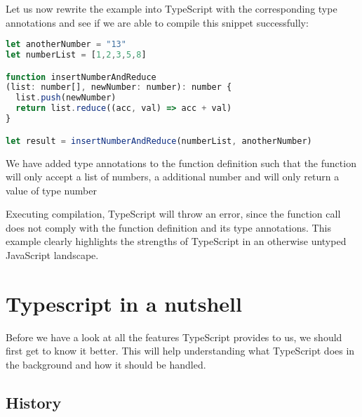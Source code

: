 \documentclass[english,runningheads, letterpaper]{llncs}[2018/03/10]
\begin{document}
Let us now rewrite the example into TypeScript with the corresponding
type annotations and see if we are able to compile this snippet successfully:

\begin{lstlisting}[style=ES6, language=JavaScript, caption="Fixed TypeScript code snippet"]
let anotherNumber = "13"
let numberList = [1,2,3,5,8]

function insertNumberAndReduce
(list: number[], newNumber: number): number {
  list.push(newNumber)
  return list.reduce((acc, val) => acc + val)
}

let result = insertNumberAndReduce(numberList, anotherNumber)
\end{lstlisting}

\begin{note}
We have added type annotations to the function definition such that
the function will only accept a list of numbers, a additional number
and will only return a value of type number
\end{note}

Executing compilation, TypeScript will throw an error, since the function
call does not comply with the function definition and its
type annotations.
This example clearly highlights the strengths of TypeScript in an otherwise untyped JavaScript landscape.


\section{Typescript in a nutshell}

Before we have a look at all the features TypeScript provides to us, we should first get to know it better. This will help understanding what TypeScript does in the background and how it should be handled.

\pagebreak
\subsection{History \cite{ref_ts_wikipedia}}
\end{document}
